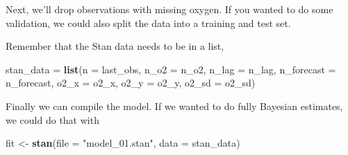 \documentclass[
]{article}
\newenvironment{Shaded}{\begin{snugshade}}{\end{snugshade}}
\newcommand{\CommentTok}[1]{\textcolor[rgb]{0.56,0.35,0.01}{\textit{#1}}}
\newcommand{\DataTypeTok}[1]{\textcolor[rgb]{0.13,0.29,0.53}{#1}}
\newcommand{\KeywordTok}[1]{\textcolor[rgb]{0.13,0.29,0.53}{\textbf{#1}}}
\newcommand{\NormalTok}[1]{#1}
\newcommand{\OperatorTok}[1]{\textcolor[rgb]{0.81,0.36,0.00}{\textbf{#1}}}
\newcommand{\StringTok}[1]{\textcolor[rgb]{0.31,0.60,0.02}{#1}}
\begin{document}
Next, we'll drop observations with missing oxygen. If you wanted to do
some validation, we could also split the data into a training and test
set.

\begin{Shaded}
\end{Shaded}

Remember that the Stan data needs to be in a list,

\begin{Shaded}
\begin{Highlighting}[]
\NormalTok{stan_data =}\StringTok{ }\KeywordTok{list}\NormalTok{(}\DataTypeTok{n =}\NormalTok{ last_obs, }\DataTypeTok{n_o2 =}\NormalTok{ n_o2, }\DataTypeTok{n_lag =}\NormalTok{ n_lag, }\DataTypeTok{n_forecast =}\NormalTok{ n_forecast, }
    \DataTypeTok{o2_x =}\NormalTok{ o2_x, }\DataTypeTok{o2_y =}\NormalTok{ o2_y, }\DataTypeTok{o2_sd =}\NormalTok{ o2_sd)}
\end{Highlighting}
\end{Shaded}

Finally we can compile the model. If we wanted to do fully Bayesian
estimates, we could do that with

\begin{Shaded}
\begin{Highlighting}[]
\NormalTok{fit <-}\StringTok{ }\KeywordTok{stan}\NormalTok{(}\DataTypeTok{file =} \StringTok{"model_01.stan"}\NormalTok{, }\DataTypeTok{data =}\NormalTok{ stan_data)}
\end{Highlighting}
\end{Shaded}
\end{document}

